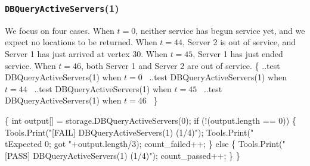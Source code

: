 \documentclass{article}
\def\nwendcode{\endtrivlist \endgroup}
\let\nwdocspar=\par
\begin{document}
\subsubsection{{\tt{}DBQueryActiveServers}(1)}
We focus on four cases. When $t=0$, neither service has begun service yet,
and we expect no locations to be returned. When $t=44$, Server 2 is out of
service, and Server 1 has just arrived at vertex 30. When $t=45$, Server 1
has just ended service. When $t=46$, both Server 1 and Server 2 are out of
service.
\nwenddocs{}\endmoddef{}
\{
  \LA{}..test \code{}DBQueryActiveServers\edoc{}(1) when $t=0$~{\nwtagstyle{}}\RA{}
  \LA{}..test \code{}DBQueryActiveServers\edoc{}(1) when $t=44$~{\nwtagstyle{}}\RA{}
  \LA{}..test \code{}DBQueryActiveServers\edoc{}(1) when $t=45$~{\nwtagstyle{}}\RA{}
  \LA{}..test \code{}DBQueryActiveServers\edoc{}(1) when $t=46$~{\nwtagstyle{}}\RA{}
\}
\nwendcode{}\nwdocspar
\nwenddocs{}\endmoddef{}
\{
  int output[] = storage.DBQueryActiveServers(0);
  if (!(output.length == 0)) \{
    Tools.Print("[FAIL] DBQueryActiveServers(1) (1/4)");
    Tools.Print("\\tExpected 0; got "+output.length/3);
    count_failed++;
  \} else \{
    Tools.Print("[PASS] DBQueryActiveServers(1) (1/4)");
    count_passed++;
  \}
\}
\nwendcode{}\nwdocspar
\nwenddocs{}\endmoddef{}
\end{document}
